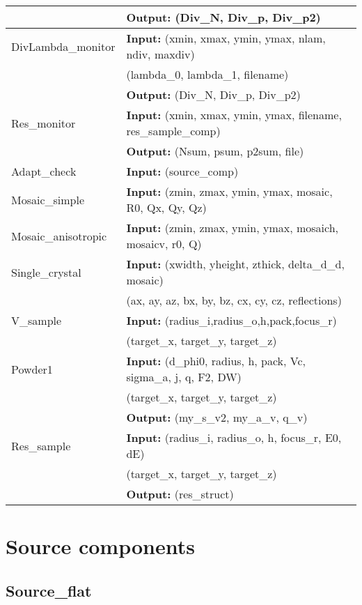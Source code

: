 \begin{center}
\begin{tabular}{|ll|}
 & \textbf{Output:} (Div\_N, Div\_p, Div\_p2) \\
\hline
DivLambda\_monitor & \textbf{Input:} (xmin, xmax, ymin, ymax, nlam, ndiv, maxdiv) \\
          & \phantom{\textbf{Input:}\ }(lambda\_0, lambda\_1, filename) \\
 & \textbf{Output:} (Div\_N, Div\_p, Div\_p2) \\
\hline
Res\_monitor & \textbf{Input:} (xmin, xmax, ymin, ymax, filename, res\_sample\_comp) \\
 & \textbf{Output:} (Nsum, psum, p2sum, file) \\
\hline
Adapt\_check & \textbf{Input:} (source\_comp) \\
\hline
Mosaic\_simple & \textbf{Input:} (zmin, zmax, ymin, ymax, mosaic, R0, Qx, Qy, Qz) \\
\hline
Mosaic\_anisotropic & \textbf{Input:} (zmin, zmax, ymin, ymax, mosaich, mosaicv, r0, Q) \\
\hline
Single\_crystal & \textbf{Input:} (xwidth, yheight, zthick, delta\_d\_d, mosaic) \\
 & \phantom{\textbf{Input:}\ }(ax, ay, az, bx, by, bz, cx, cy, cz, reflections) \\
\hline
V\_sample & \textbf{Input:} (radius\_i,radius\_o,h,pack,focus\_r) \\
 & \phantom{\textbf{Input:}\ }(target\_x, target\_y, target\_z) \\
\hline
Powder1 & \textbf{Input:} (d\_phi0, radius, h, pack, Vc, sigma\_a, j, q, F2, DW) \\
 & \phantom{\textbf{Input:}\ }(target\_x, target\_y, target\_z) \\
 & \textbf{Output:} (my\_s\_v2, my\_a\_v, q\_v) \\
\hline
Res\_sample & \textbf{Input:} (radius\_i, radius\_o, h, focus\_r, E0, dE) \\
 & \phantom{\textbf{Input:}\ }(target\_x, target\_y, target\_z) \\
 & \textbf{Output:} (res\_struct) \\
\hline
\end{tabular}
\end{center}

\newpage

\section{Source components}

\subsection{Source\_flat}
\newpage

